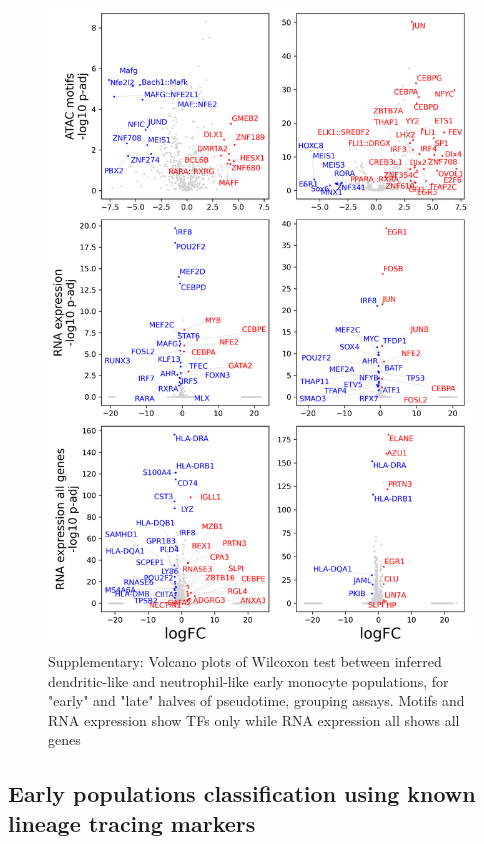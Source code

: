 \documentclass[a4paper]{article}
\begin{document}
\begin{figure}[!htb]
  \centering
  \includegraphics[width=\textwidth]{../figures/hematopoiesis/early_groups_grouped_assays.png}
  \caption{Supplementary: Volcano plots of Wilcoxon test between inferred dendritic-like and neutrophil-like early monocyte populations, for "early" and "late" halves of pseudotime, grouping assays. Motifs and RNA expression show TFs only while RNA expression all shows all genes}
\end{figure}

\FloatBarrier
\subsection{Early populations classification using known lineage tracing markers}
\end{document}
